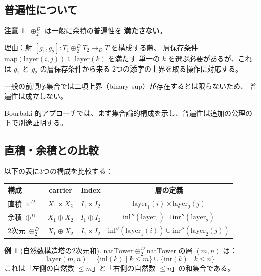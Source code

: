 \documentclass[a4paper,11pt]{ltjsarticle}
\theoremstyle{definition}
\newtheorem{example}[definition]{例}
\newtheorem{remark}[definition]{注意}
\begin{document}
\subsection{普遍性について}

\begin{remark}
$\oplus_2^D$ は一般に余積の普遍性を \textbf{満たさない}。

理由：射 $[g_1, g_2] : T_1 \oplus_2^D T_2 \to_D T$ を構成する際、
層保存条件 $\mathrm{map}(\mathrm{layer}(i, j)) \subseteq \mathrm{layer}(k)$ を満たす
単一の $k$ を選ぶ必要があるが、これは $g_1$ と $g_2$ の層保存条件から来る
2つの添字の上界を取る操作に対応する。

一般の前順序集合では二項上界（binary sup）が存在するとは限らないため、
普遍性は成立しない。

Bourbaki 的アプローチでは、まず集合論的構成を示し、普遍性は追加の公理の下で別途証明する。
\end{remark}

\subsection{直積・余積との比較}

以下の表に3つの構成を比較する：

\begin{center}
\begin{tabular}{|l|c|c|c|}
\hline
構成 & carrier & Index & 層の定義 \\
\hline
直積 $\times^D$ & $X_1 \times X_2$ & $I_1 \times I_2$ & $\mathrm{layer}_1(i) \times \mathrm{layer}_2(j)$ \\
余積 $\oplus^D$ & $X_1 \oplus X_2$ & $I_1 \oplus I_2$ & $\mathrm{inl}''(\mathrm{layer}_1) \sqcup \mathrm{inr}''(\mathrm{layer}_2)$ \\
2次元 $\oplus_2^D$ & $X_1 \oplus X_2$ & $I_1 \times I_2$ & $\mathrm{inl}''(\mathrm{layer}_1(i)) \cup \mathrm{inr}''(\mathrm{layer}_2(j))$ \\
\hline
\end{tabular}
\end{center}

\begin{example}[自然数構造塔の2次元和]
$\mathrm{natTower} \oplus_2^D \mathrm{natTower}$ の層 $(m, n)$ は：
\[
\mathrm{layer}(m, n) = \{\mathrm{inl}(k) \mid k \leq m\} \cup \{\mathrm{inr}(k) \mid k \leq n\}
\]
これは「左側の自然数 $\leq m$」と「右側の自然数 $\leq n$」の和集合である。
\end{example}
\end{document}
